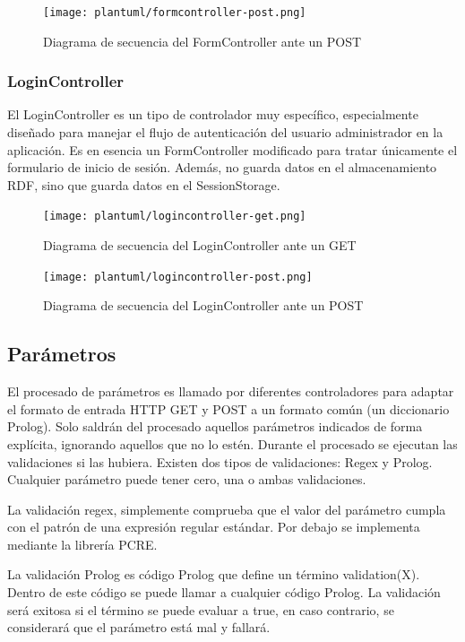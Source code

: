 \documentclass[12pt]{report} %
\begin{document}
\begin{figure}
    \centering
    \texttt{[image: plantuml/formcontroller-post.png]}
    \caption{Diagrama de secuencia del FormController ante un POST}
    \label{fig:formcontrollerpost}
\end{figure}

\subsubsection{LoginController}

El LoginController es un tipo de controlador muy específico, especialmente diseñado para manejar el flujo de autenticación del usuario administrador en la aplicación. Es en esencia un FormController modificado para tratar únicamente el formulario de inicio de sesión. Además, no guarda datos en el almacenamiento RDF, sino que guarda datos en el SessionStorage.

\begin{figure}
    \centering
    \texttt{[image: plantuml/logincontroller-get.png]}
    \caption{Diagrama de secuencia del LoginController ante un GET}
    \label{fig:logincontrollerget}
\end{figure}

\begin{figure}[h]
    \centering
    \texttt{[image: plantuml/logincontroller-post.png]}
    \caption{Diagrama de secuencia del LoginController ante un POST}
    \label{fig:logincontrollerpost}
\end{figure}

\subsection{Parámetros}
El procesado de parámetros es llamado por diferentes controladores para adaptar el formato de entrada HTTP GET y POST a un formato común (un diccionario Prolog).
Solo saldrán del procesado aquellos parámetros indicados de forma explícita, ignorando aquellos que no lo estén.
Durante el procesado se ejecutan las validaciones si las hubiera. Existen dos tipos de validaciones: Regex y Prolog.
Cualquier parámetro puede tener cero, una o ambas validaciones.

La validación regex, simplemente comprueba que el valor del parámetro cumpla con el patrón de una expresión regular estándar. Por debajo se implementa mediante la librería PCRE.

La validación Prolog es código Prolog que define un término validation(X). Dentro de este código se puede llamar a cualquier código Prolog.
La validación será exitosa si el término se puede evaluar a true, en caso contrario, se considerará que el parámetro está mal y fallará.
\end{document}

